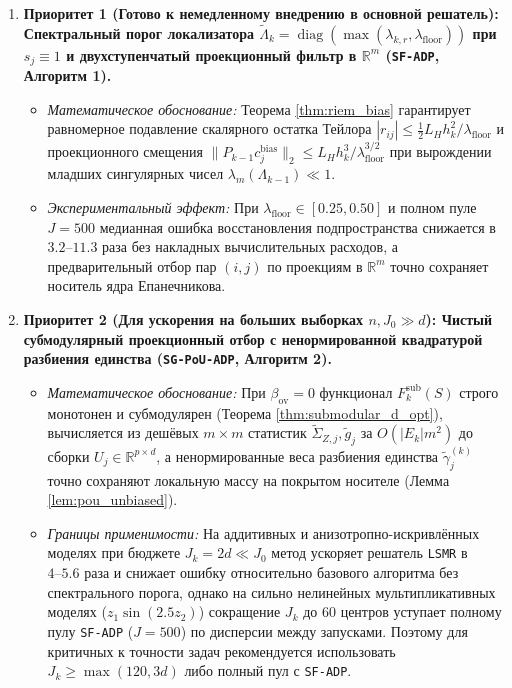\documentclass[11pt,a4paper]{article}
\newcommand{\R}{\mathbb{R}}
\DeclareMathOperator{\diag}{diag}
\theoremstyle{definition}
\theoremstyle{remark}
\begin{document}
\begin{enumerate}
    \item \textbf{Приоритет 1 (Готово к немедленному внедрению в основной решатель): Спектральный порог локализатора $\widetilde{\Lambda}_k = \diag(\max(\lambda_{k,r}, \lambda_{\mathrm{floor}}))$ при $s_j \equiv 1$ и двухступенчатый проекционный фильтр в $\R^m$ (\texttt{SF-ADP}, Алгоритм 1).}
    \begin{itemize}
        \item \emph{Математическое обоснование:} Теорема \ref{thm:riem_bias} гарантирует равномерное подавление скалярного остатка Тейлора $|r_{ij}| \le \frac{1}{2}L_H h_k^2 / \lambda_{\mathrm{floor}}$ и проекционного смещения $\|P_{k-1}c_j^{\mathrm{bias}}\|_2 \le L_H h_k^3 / \lambda_{\mathrm{floor}}^{3/2}$ при вырождении младших сингулярных чисел $\lambda_m(\Lambda_{k-1}) \ll 1$.
        \item \emph{Экспериментальный эффект:} При $\lambda_{\mathrm{floor}} \in [0.25, 0.50]$ и полном пуле $J=500$ медианная ошибка восстановления подпространства снижается в $3.2\text{--}11.3$ раза без накладных вычислительных расходов, а предварительный отбор пар $(i,j)$ по проекциям в $\R^m$ точно сохраняет носитель ядра Епанечникова.
    \end{itemize}
    \item \textbf{Приоритет 2 (Для ускорения на больших выборках $n, J_0 \gg d$): Чистый субмодулярный проекционный отбор с ненормированной квадратурой разбиения единства (\texttt{SG-PoU-ADP}, Алгоритм 2).}
    \begin{itemize}
        \item \emph{Математическое обоснование:} При $\beta_{\mathrm{ov}} = 0$ функционал $F_k^{\mathrm{sub}}(S)$ строго монотонен и субмодулярен (Теорема \ref{thm:submodular_d_opt}), вычисляется из дешёвых $m \times m$ статистик $\widetilde{\Sigma}_{Z,j}, \tilde{g}_j$ за $O(|E_k|m^2)$ до сборки $U_j \in \R^{p \times d}$, а ненормированные веса разбиения единства $\tilde{\gamma}_j^{(k)}$ точно сохраняют локальную массу на покрытом носителе (Лемма \ref{lem:pou_unbiased}).
        \item \emph{Границы применимости:} На аддитивных и анизотропно-искривлённых моделях при бюджете $J_k = 2d \ll J_0$ метод ускоряет решатель \texttt{LSMR} в $4\text{--}5.6$ раза и снижает ошибку относительно базового алгоритма без спектрального порога, однако на сильно нелинейных мультипликативных моделях ($z_1 \sin(2.5 z_2)$) сокращение $J_k$ до $60$ центров уступает полному пулу \texttt{SF-ADP} ($J=500$) по дисперсии между запусками. Поэтому для критичных к точности задач рекомендуется использовать $J_k \ge \max(120, 3d)$ либо полный пул с \texttt{SF-ADP}.

\end{itemize}
\end{enumerate}
\end{document}
